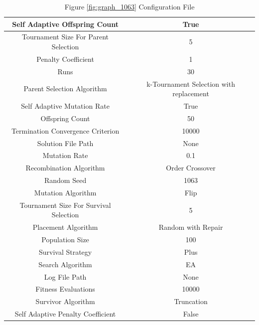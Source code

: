 \documentclass{standalone}
\begin{document}
\begin{table}[!htb]
	\centering
	\caption{Figure \ref{fig:graph_1063} Configuration File}
	\label{tab:graph_1063}
	\begin{tabular}{| c | c |}
		\hline
		Self Adaptive Offspring Count		& True		 \\
		\hline
		Tournament Size For Parent Selection		& 5		 \\
		\hline
		Penalty Coefficient		& 1		 \\
		\hline
		Runs		& 30		 \\
		\hline
		Parent Selection Algorithm		& k-Tournament Selection with replacement		 \\
		\hline
		Self Adaptive Mutation Rate		& True		 \\
		\hline
		Offspring Count		& 50		 \\
		\hline
		Termination Convergence Criterion		& 10000		 \\
		\hline
		Solution File Path		& None		 \\
		\hline
		Mutation Rate		& 0.1		 \\
		\hline
		Recombination Algorithm		& Order Crossover		 \\
		\hline
		Random Seed		& 1063		 \\
		\hline
		Mutation Algorithm		& Flip		 \\
		\hline
		Tournament Size For Survival Selection		& 5		 \\
		\hline
		Placement Algorithm		& Random with Repair		 \\
		\hline
		Population Size		& 100		 \\
		\hline
		Survival Strategy		& Plus		 \\
		\hline
		Search Algorithm		& EA		 \\
		\hline
		Log File Path		& None		 \\
		\hline
		Fitness Evaluations		& 10000		 \\
		\hline
		Survivor Algorithm		& Truncation		 \\
		\hline
		Self Adaptive Penalty Coefficient		& False		 \\
		\hline
	\end{tabular}
\end{table}
\end{document}
